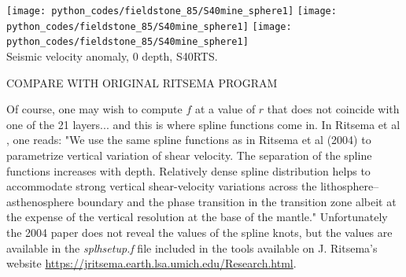 \begin{center}
\texttt{[image: python\_codes/fieldstone\_85/S40mine\_sphere1]}
\texttt{[image: python\_codes/fieldstone\_85/S40mine\_sphere1]}
\texttt{[image: python\_codes/fieldstone\_85/S40mine\_sphere1]}\\
{\captionfont Seismic velocity anomaly, 0 depth, S40RTS.}
\end{center}


COMPARE WITH ORIGINAL RITSEMA PROGRAM





Of course, one may wish to compute $f$ at a value of $r$ that does not coincide with one of the 21 layers... 
and this is where spline functions come in.  
In Ritsema et al \cite{ridv11}, one reads: "We use the same 
spline functions as in Ritsema et al (2004) \cite{rivw04} to parametrize vertical 
variation of shear velocity. The separation of the spline functions
increases with depth. Relatively dense spline distribution helps to
accommodate strong vertical shear-velocity variations across the
lithosphere–asthenosphere boundary and the phase transition in the
transition zone albeit at the expense of the vertical resolution at
the base of the mantle."
Unfortunately the 2004 paper does not reveal the values of the spline knots, but the values
are available in the {\sl splhsetup.f} file included in the tools available 
on J. Ritsema's website \url{https://jritsema.earth.lsa.umich.edu/Research.html}.


